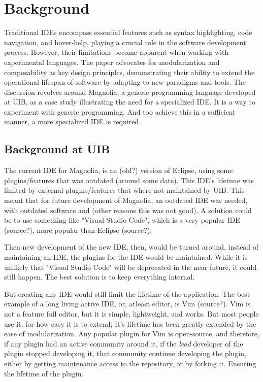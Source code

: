 \section{Background}

Traditional IDEs encompass essential features such as syntax highlighting, code
navigation, and hover-help, playing a crucial role in the software development
process. However, their limitations become apparent when working with
experimental languages. The paper advocates for modularization and composability
as key design principles, demonstrating their ability to extend the operational
lifespan of software by adapting to new paradigms and tools. The discussion
revolves around Magnolia, a generic programming language developed at UIB, as a
case study illustrating the need for a specialized IDE. It is a way to experiment
with generic programming. And too achieve this in a sufficient manner, a more
specialized IDE is required.

\subsection{Background at UIB}

The current IDE for Magnolia, is an (old?) version of Eclipse, using some
plugins/features that was outdated (around some date). This IDE's lifetime was
limited by external plugins/features that where not maintained by UIB. This
meant that for future development of Magnolia, an outdated IDE was needed, with
outdated software and (other reasons this was not good). A solution could be to
use something like "Visual Studio Code", which is a very popular IDE (source?),
more popular than Eclipse (source?).

Then new development of the new IDE, then, would be turned around, instead of
maintaining an IDE, the plugins for the IDE would be maintained. While it is
unlikely that "Visual Studio Code" will be deprecated in the near future, it
could still happen. The best solution is to keep everything internal.

But creating any IDE would still limit the lifetime of the application. The best
example of a long living active IDE, or, atleast editor, is Vim (source?). Vim
is not a feature full editor, but it is simple, lightweight, and works. But most
people use it, for how easy it is to extend; It's lifetime has been greatly
extended by the ease of modularization. Any popular plugin for Vim is
open-source, and therefore, if any plugin had an active community around it, if
the \textit{lead} developer of the plugin stopped developing it, that community
continue developing the plugin, either by getting maintenance access to the
repository, or by forking it. Ensuring the lifetime of the plugin.

